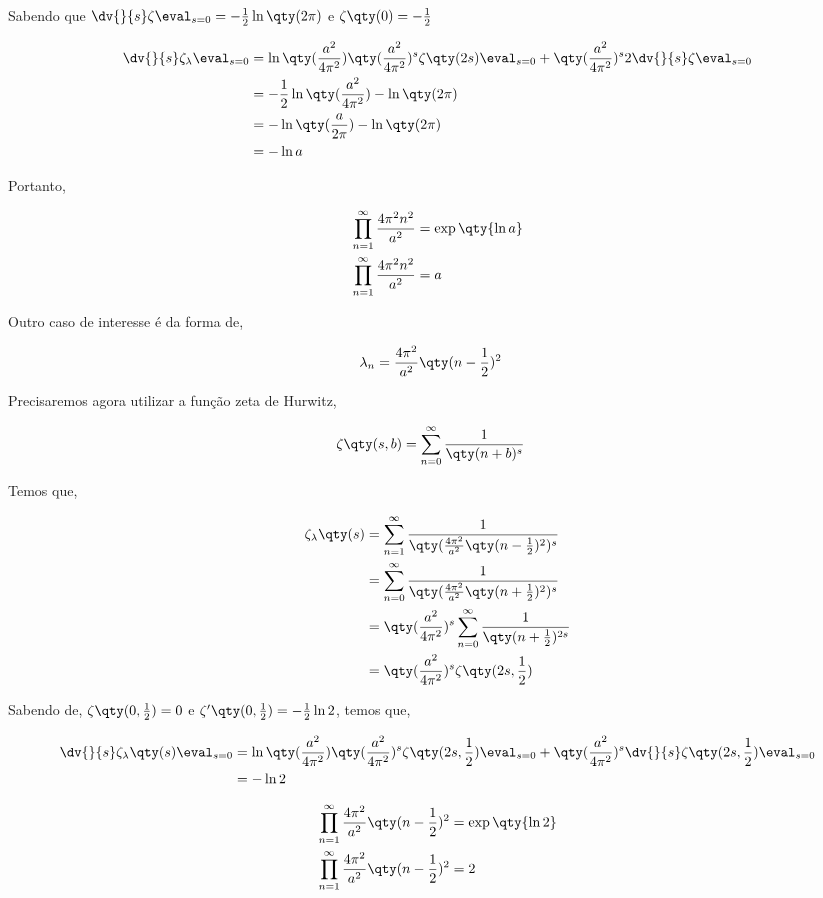 \documentclass[twoside]{amsart}
\numberwithin{equation}{section}
\begin{document}
\begin{refsection}
Sabendo que $\dv{}{s}\zeta\eval_{s=0}=-\frac12\ln\qty(2\pi)$ e $\zeta\qty(0)=-\frac12$

\begin{align}
    \dv{}{s}\zeta_{\lambda}\eval_{s=0}&=\ln\qty(\frac{a^2}{4\pi^2})\qty(\frac{a^2}{4\pi^2})^s\zeta\qty(2s)\eval_{s=0}+\qty(\frac{a^2}{4\pi^2})^s2\dv{}{s}\zeta\eval_{s=0}\\
    &=-\frac12\ln\qty(\frac{a^2}{4\pi^2})-\ln\qty(2\pi)\\
    &=-\ln\qty(\frac{a}{2\pi})-\ln\qty(2\pi)\\
    &=-\ln a\\
\end{align}

Portanto,

\begin{align}
    \prod\limits_{n=1}^{\infty}\frac{4\pi^2n^2}{a^2}&=\exp\qty{\ln a}\\
    \prod\limits_{n=1}^{\infty}\frac{4\pi^2n^2}{a^2}&=a
\end{align}

Outro caso de interesse é da forma de,

\begin{align}
    \lambda_n&=\frac{4\pi^2}{a^2}\qty(n-\frac12)^2
\end{align}

Precisaremos agora utilizar a função zeta de Hurwitz,

\begin{align}
    \zeta\qty(s,b)&=\sum\limits_{n=0}^\infty\frac{1}{\qty(n+b)^s}
\end{align}

Temos que,

\begin{align}
    \zeta_\lambda\qty(s)&=\sum\limits_{n=1}^\infty\frac{1}{\qty(\frac{4\pi^2}{a^2}\qty(n-\frac12)^2)^s}\\
    &=\sum\limits_{n=0}^\infty\frac{1}{\qty(\frac{4\pi^2}{a^2}\qty(n+\frac12)^2)^s}\\
    &=\qty(\frac{a^2}{4\pi^2})^s\sum\limits_{n=0}^\infty\frac{1}{\qty(n+\frac12)^{2s}}\\
    &=\qty(\frac{a^2}{4\pi^2})^s\zeta\qty(2s,\frac12)
\end{align}

Sabendo de, $\zeta\qty(0,\frac12)=0$ e $\zeta'\qty(0,\frac12)=-\frac12\ln2$, temos que,

\begin{align}
    \dv{}{s}\zeta_\lambda\qty(s)\eval_{s=0}&=\ln\qty(\frac{a^2}{4\pi^2})\qty(\frac{a^2}{4\pi^2})^s\zeta\qty(2s,\frac12)\eval_{s=0}+\qty(\frac{a^2}{4\pi^2})^s\dv{}{s}\zeta\qty(2s,\frac12)\eval_{s=0}\\
    &=-\ln2
\end{align}

\begin{align}
    \prod\limits_{n=1}^{\infty}\frac{4\pi^2}{a^2}\qty(n-\frac12)^2&=\exp\qty{\ln 2}\\
    \prod\limits_{n=1}^{\infty}\frac{4\pi^2}{a^2}\qty(n-\frac12)^2&=2
\end{align}

\printbibliography[heading=subbibliography]
\end{refsection}
\end{document}
